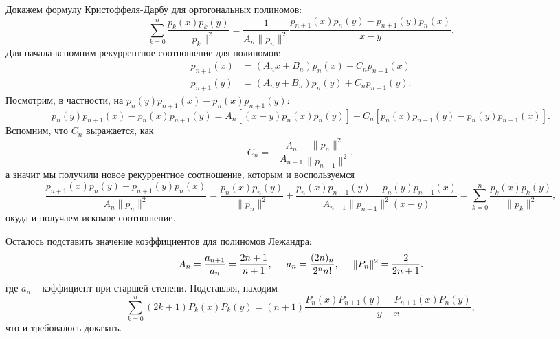Докажем формулу Кристоффеля-Дарбу для ортогональных полиномов:
\begin{equation*}
    \sum_{k=0}^{n} \frac{p_k (x) p_k (y)}{\|p_k\|^2} = \frac{1}{A_n \|p_n\|^2} \frac{p_{n+1} (x) p_n (y) - p_{n+1} (y) p_n (x)}{x-y}.
\end{equation*}
Для начала вспомним рекуррентное соотношение для полиномов:
\begin{align*}
    p_{n+1} (x) &= (A_n x + B_n) p_n (x) + C_n p_{n-1} (x) \\
    p_{n+1} (y) &= (A_n y + B_n) p_n (y) + C_n p_{n-1} (y).
\end{align*}
Посмотрим, в частности, на $p_n (y) p_{n+1} (x) - p_n (x) p_{n+1} (y)$:
\begin{equation*}
    p_n (y) p_{n+1} (x) - p_n (x) p_{n+1} (y) = 
    A_n \left[(x-y) p_n (x) p_n (y)\right] - 
    C_n \left[
        p_n (x) p_{n-1} (y) - p_n (y) p_{n-1} (x)
    \right].
\end{equation*}
Вспомним, что $C_n$ выражается, как
\begin{equation*}
    C_n = - \frac{A_n}{A_{n-1}} \frac{\|p_n\|^2}{\|p_{n-1}\|^2},
\end{equation*}
а значит мы получили новое рекуррентное соотношение, которым и воспользуемся
\begin{equation*}
    \frac{p_{n+1} (x) p_n (y) - p_{n+1} (y) p_n (x)}{A_n \|p_n\|^2} = 
    \frac{p_n (x) p_n (y)}{\|p_n\|^2} + 
    \frac{p_n (x) p_{n-1} (y) - p_n (y) p_{n-1} (x)}{A_{n-1} \|p_{n-1}\|^2(x-y)} = \sum_{k=0}^{n} 
    \frac{p_k (x) p_k (y)}{\|p_k\|^2},
\end{equation*}
окуда и получаем искомое соотношение. 

Осталось подставить значение коэффициентов для полиномов Лежандра:
\begin{equation*}
    A_{n} = \frac{a_{n+1}}{a_n} = \frac{2n+1}{n+1},
    \hspace{5 mm} 
    a_n = \frac{(2n)_n}{2^n n!},
    \hspace{5 mm} 
    \|P_n\|^2 = \frac{2}{2n+1}.
\end{equation*}
где $a_n$ -- кэффициент при старшей степени. Подставляя, находим
\begin{equation*}
    \sum_{k=0}^{n} (2k + 1) P_k (x) P_k (y) = (n+1) \frac{P_n (x) P_{n+1} (y) - P_{n+1} (x) P_n (y)}{y-x},
\end{equation*}
что и требовалось доказать.